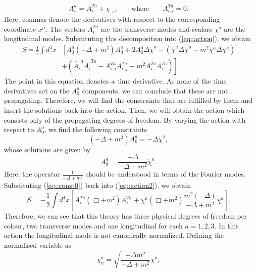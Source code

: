 \documentclass{article}
\begin{document}
\begin{equation}\label{eq::decomposition}
    A_i^a=A_i^{Ta}+\chi_{,i},\qquad\text{where}\qquad A_{i,i}^{Ta}=0.
\end{equation}
Here, commas denote the derivatives with respect to the corresponding coordinate $x^{\mu}$. The vectors $A_i^{Ta}$ are the transverse modes and scalars $\chi^a$ are the longitudinal modes. Substituting this decomposition into (\ref{eq::action}), we obtain 
\begin{equation}\label{eq::action2}
    \begin{split}
        S=\frac{1}{2}\int d^4x &\left[A_0^a\left(-\Delta+m^2\right)A_0^a+2A_0^a\Delta\dot{\chi}^a-\left(\dot{\chi}^a\Delta\dot{\chi}^a-m^2\chi^a\Delta\chi^a\right)\right.\\ &\left.+\left(\dot{A_i}^a\dot{A_i}^{Ta}-A_{i,j}^{Ta}A_{i,j}^{Ta}-m^2A_i^{Ta}A_i^{Ta}\right)\right].
        \end{split}
\end{equation}
The point in this equation denotes a time derivative. As none of the time derivatives act on the $A_0^a$ components, we can conclude that these are not propagating. Therefore, we will find the constraints that are fulfilled by them and insert the solutions back into the action. Then, we will obtain the action which consists only of the propagating degrees of freedom. By varying the action with respect to $A_0^a$, we find the following constraints
\begin{equation}
     (-\Delta+m^2)A_0^{a}=-\Delta\dot{\chi}^{a},
\end{equation}
whose solutions are given by
\begin{equation}\label{eq::const0}
    A^{a}_0=\frac{-\Delta}{-\Delta+m^2}\dot{\chi}^{a}.
\end{equation}
Here, the operator $\frac{1}{-\Delta+m^2}$ should be understood in terms of the Fourier modes. Substituting (\ref{eq::const0}) back into (\ref{eq::action2}), we obtain
\begin{equation}\label{eq::action3}
    S=-\frac{1}{2}\int d^4x\left[A_i^{Ta}(\Box+m^2)A_i^{Ta}+\chi^a(\Box+m^2)\frac{m^2(-\Delta)}{-\Delta+m^2}\chi^a\right].
\end{equation}
Therefore, we can see that this theory has three physical degrees of freedom per colour, two transverse modes and one longitudinal for each $a=1,2,3$. In this action the longitudinal mode is not canonically normalized. Defining the normalised variable as
\begin{equation}\label{eq::cannorm}
    \chi_n^a=\sqrt{\frac{-\Delta m^2}{-\Delta+m^2}}\chi^a,
\end{equation}
\end{document}
